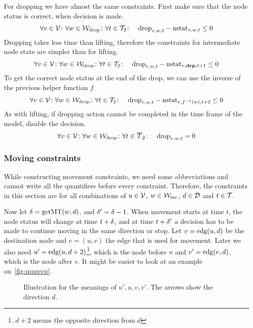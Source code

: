 For dropping we have almost the same constraints. First make sure that the node
status is correct, when decision is made.
\begin{align}
    &\forall v \in \mathcal{V} \colon \forall w \in \mathcal{W}_\mathrm{drop} \colon \forall t \in \mathcal{T}_2 \colon
    &\mathrm{drop}_{v,w,t} - \mathrm{nstat}_{v,w,t} \leq 0
\end{align}
Dropping takes less time than lifting, therefore the constraints for
intermediate node state are simpler than for lifting.
\begin{align}
    &\forall v \in \mathcal{V} \colon \forall w \in \mathcal{W}_\mathrm{drop} \colon \forall t \in \mathcal{T}_2 \colon
    &\mathrm{drop}_{v,w,t} - \mathrm{nstat}_{v,\text{\bf drp},t+1} \leq 0
\end{align}
To get the correct node status at the end of the drop, we can use the inverse
of the previous helper function $f$.
\begin{align}
    &\forall v \in \mathcal{V} \colon \forall w \in \mathcal{W}_\mathrm{drop} \colon \forall t \in \mathcal{T}_2 \colon
    &\mathrm{drop}_{v,w,t} - \mathrm{nstat}_{v,f^{-1}(w),t+2} \leq 0
\end{align}
As with lifting, if dropping action cannot be completed in the time frame of
the model, disable the decision.
\begin{align}
    &\forall v \in \mathcal{V} \colon \forall w \in \mathcal{W}_\mathrm{drop} \colon \forall t \in \overline{\mathcal{T}}_2
    \colon &\mathrm{drop}_{v,w,t} = 0
\end{align}

\subsubsection{Moving constraints}
While constructing movement constraints, we need some abbreviations and cannot
write all the quantifiers before every constraint. Therefore, the constraints
in this section are for all combinations of $u \in \mathcal{V}$, $w \in \mathcal{W}_\mathrm{mc}$, $d \in
\mathcal{D}$ and $t \in \mathcal{T}$.

Now let $\delta = \mathrm{getMT}(w,d)$, and $\delta' = \delta-1$. When movement starts at time $t$,
the node status will change at time $t+\delta$, and at time $t+\delta'$ a decision
has to be made to continue moving in the same direction or stop. Let $v =
\mathrm{edg}(u,d)$ be the destination node and $e = (u,v)$ the edge that is used for
movement. Later we also need $u' = \mathrm{edg}(u,d+2)$\footnote{$d+2$ means the
opposite direction from $d$}, which is the node before $u$ and $v' =
\mathrm{edg}(v,d)$, which is the node after $v$. It might be easier to look at an
example on~\autoref{fig:upuvvp}.

\begin{figure}[h]
    \begin{center}
        
        \caption{Illustration for the meanings of $u',u,v,v'$. The arrows show
        the direction $d$.}
        \label{fig:upuvvp}
    \end{center}
\end{figure}

